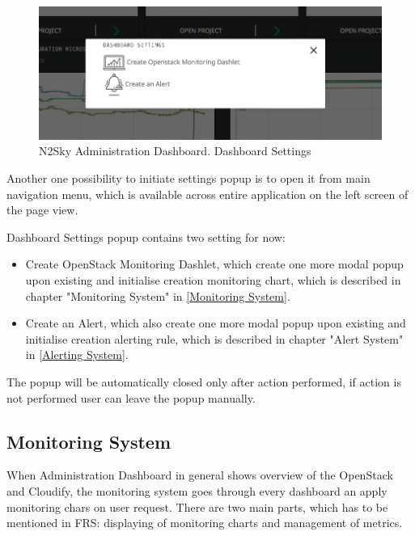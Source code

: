 \begin{figure}[htbp]
\begin{center}
  \includegraphics[width=\linewidth]{components/4/pics/dashboard_settings.png}
  \caption{N2Sky Administration Dashboard. Dashboard Settings}
  \label{fig:dashboard_settings}
\end{center}
\end{figure}

Another one possibility to initiate settings popup is to open it from main navigation menu, which is available across entire application on the left screen of the page view. 

Dashboard Settings popup contains two setting for now:
\begin{itemize}
\item Create OpenStack Monitoring Dashlet, which create one more modal popup upon existing and initialise creation monitoring chart, which is described in chapter "Monitoring System" in \autoref{Monitoring System}.
\item Create an Alert, which also create one more modal popup upon existing and initialise creation alerting rule, which is described in chapter "Alert System" in \autoref{Alerting System}.
\end{itemize}

The popup will be automatically closed only after action performed, if action is not performed user can leave the popup manually.



\subsection{Monitoring System}\label{Monitoring System}

When Administration Dashboard in general shows overview of the OpenStack and Cloudify, the monitoring system goes through every dashboard an apply monitoring chars on user request. There are two main parts, which has to be mentioned in FRS: displaying of monitoring charts and management of metrics.
 
